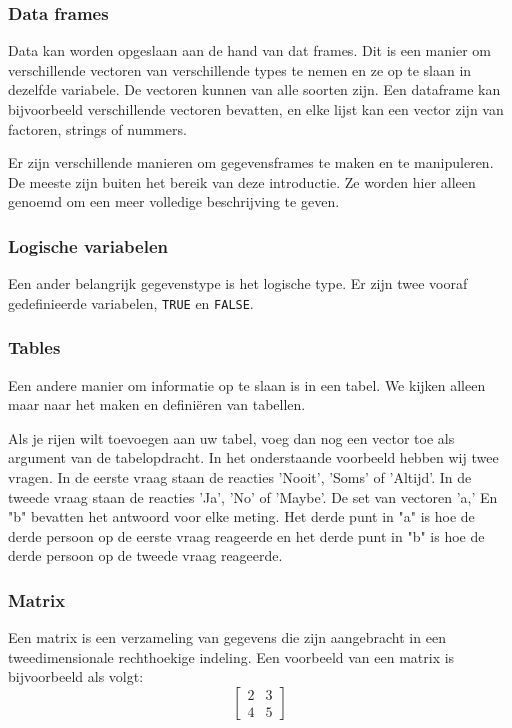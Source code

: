 \subsubsection{Data frames}
Data kan worden opgeslaan aan de hand van dat frames. Dit is een manier om verschillende vectoren van verschillende types te nemen en ze op te slaan in dezelfde variabele. De vectoren kunnen van alle soorten zijn. Een dataframe kan bijvoorbeeld verschillende vectoren bevatten, en elke lijst kan een vector zijn van factoren, strings of nummers.

Er zijn verschillende manieren om gegevensframes te maken en te manipuleren. De meeste zijn buiten het bereik van deze introductie. Ze worden hier alleen genoemd om een meer volledige beschrijving te geven. 



\subsubsection{Logische variabelen}
Een ander belangrijk gegevenstype is het logische type. Er zijn twee vooraf gedefinieerde variabelen, \texttt{TRUE} en \texttt{FALSE}.

\subsubsection{Tables}
Een andere  manier om informatie op te slaan is in een tabel.  We kijken alleen maar naar het maken en defini\"eren van tabellen. 


Als je rijen wilt toevoegen aan uw tabel, voeg dan nog een vector toe als argument van de tabelopdracht. In het onderstaande voorbeeld hebben wij twee vragen. In de eerste vraag staan de reacties  'Nooit', 'Soms' of 'Altijd'. In de tweede vraag staan de reacties 'Ja', 'No' of 'Maybe'. De set van vectoren 'a,' En "b" bevatten het antwoord voor elke meting. Het derde punt in "a" is hoe de derde persoon op de eerste vraag reageerde en het derde punt in "b" is hoe de derde persoon op de tweede vraag reageerde.



\subsubsection{Matrix}
Een matrix is een verzameling van gegevens die zijn aangebracht in een tweedimensionale rechthoekige indeling. Een voorbeeld van een matrix is bijvoorbeeld als volgt:
\[
\begin{bmatrix}
	2 & 3 \\ 
	4 & 5  
\end{bmatrix}
\]

